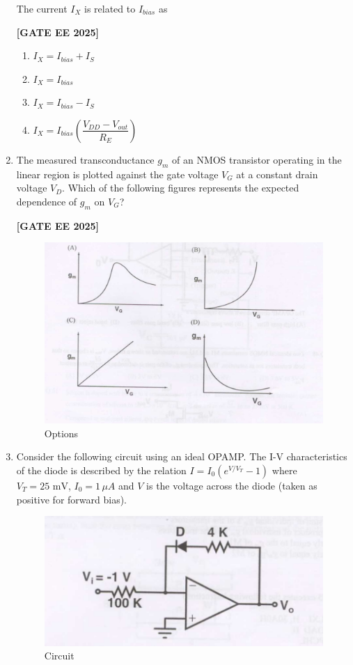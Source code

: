 \documentclass[12pt]{article}
\begin{document}
\begin{enumerate}[leftmargin=*, label=\textbf{Q.\arabic*:}]
The current $I_X$ is related to $I_{bias}$ as
 
\noindent \textbf{[GATE EE 2025]}
\begin{enumerate}
  \item $I_X = I_{bias} + I_S$
  \item $I_X = I_{bias}$
  \item $I_X = I_{bias} - I_S$
  \item $I_X = I_{bias}\left( \dfrac{V_{DD} - V_{out}}{R_E} \right)$
\end{enumerate}

\item The measured transconductance $g_m$ of an NMOS transistor operating in the linear region is plotted against the gate voltage $V_G$ at a constant drain voltage $V_D$. Which of the following figures represents the expected dependence of $g_m$ on $V_G$?
 
\noindent \textbf{[GATE EE 2025]}
\begin{figure}[H]\centering
\includegraphics[width=0.95\columnwidth]{figs/q45.png}
\caption{Options}
\label{fig:q45}
\end{figure}

\item Consider the following circuit using an ideal OPAMP. The I-V characteristics of the diode is described by the relation $I = I_0 \left( e^{V/V_T} - 1 \right)$ where $V_T = 25\text{ mV}$, $I_0 = 1\,\mu A$ and $V$ is the voltage across the diode (taken as positive for forward bias).

\begin{figure}[H]\centering
\includegraphics[width=0.5\columnwidth]{figs/q46.png}
\caption{Circuit}
\label{fig:q46}
\end{figure}


\end{enumerate}
\end{document}
